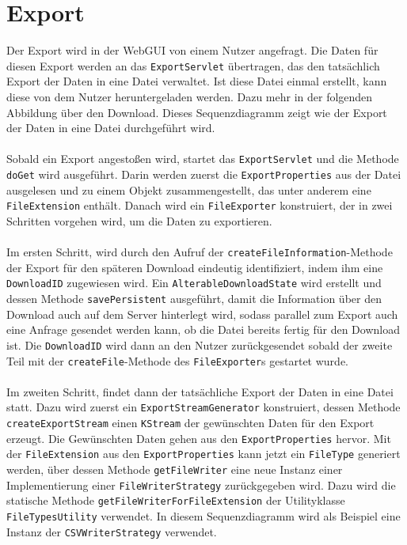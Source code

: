 \section{Export}
Der Export wird in der WebGUI von einem Nutzer angefragt. Die Daten für diesen Export werden an das \texttt{ExportServlet} übertragen, das den tatsächlich Export der Daten in eine Datei verwaltet. Ist diese Datei einmal erstellt, kann diese von dem Nutzer heruntergeladen werden. Dazu mehr in der folgenden Abbildung über den Download. Dieses Sequenzdiagramm zeigt wie der Export der Daten in eine Datei durchgeführt wird.\\\\
Sobald ein Export angestoßen wird, startet das \texttt{ExportServlet} und die Methode \texttt{doGet} wird ausgeführt. Darin werden zuerst die \texttt{ExportProperties} aus der Datei ausgelesen und zu einem Objekt zusammengestellt, das unter anderem eine \texttt{FileExtension} enthält. Danach wird ein \texttt{FileExporter} konstruiert, der in zwei Schritten vorgehen wird, um die Daten zu exportieren.\\\\
Im ersten Schritt, wird durch den Aufruf der \texttt{createFileInformation}-Methode der Export für den späteren Download eindeutig identifiziert, indem ihm eine \texttt{DownloadID} zugewiesen wird. Ein \texttt{AlterableDownloadState} wird erstellt und dessen Methode \texttt{savePersistent} ausgeführt, damit die Information über den Download auch auf dem Server hinterlegt wird, sodass parallel zum Export auch eine Anfrage gesendet werden kann, ob die Datei bereits fertig für den Download ist. Die \texttt{DownloadID} wird dann an den Nutzer zurückgesendet sobald der zweite Teil mit der \texttt{createFile}-Methode des \texttt{FileExporter}s gestartet wurde.\\\\
Im zweiten Schritt, findet dann der tatsächliche Export der Daten in eine Datei statt. Dazu wird zuerst ein \texttt{ExportStreamGenerator} konstruiert, dessen Methode \texttt{createExportStream} einen \texttt{KStream} der gewünschten Daten für den Export erzeugt. Die Gewünschten Daten gehen aus den \texttt{ExportProperties} hervor. Mit der \texttt{FileExtension} aus den \texttt{ExportProperties} kann jetzt ein \texttt{FileType} generiert werden, über dessen Methode \texttt{getFileWriter} eine neue Instanz einer Implementierung einer \texttt{FileWriterStrategy} zurückgegeben wird. Dazu wird die statische Methode \texttt{getFileWriterForFileExtension} der Utilityklasse \texttt{FileTypesUtility} verwendet. In diesem Sequenzdiagramm wird als Beispiel eine Instanz der \texttt{CSVWriterStrategy} verwendet.\\\\
